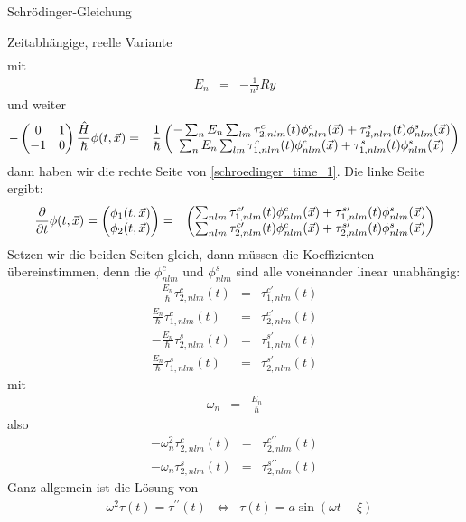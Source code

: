 \begin{chapter}{\titlestr}
\begin{section}{Schrödinger-Gleichung}
\begin{subsection}{Zeitabhängige, reelle Variante}
\begin{eqnarray*}
{}
\end{eqnarray*}
mit
\begin{eqnarray*}
E_n &=& -\frac{1}{n^2}Ry
\end{eqnarray*}
und weiter
\begin{eqnarray*}
-\begin{pmatrix} 0 & 1\\ -1 & 0\end{pmatrix}
\frac{\hat{H}}{\hbar}\phi(t, \vec{x})&=& \frac{1}{\hbar}
\begin{pmatrix}
-\sum_{n}E_n\sum_{lm} \tau^c_{2,nlm}(t)\phi^c_{nlm}(\vec{x})+\tau^s_{2,nlm}(t)\phi^s_{nlm}(\vec{x})\\
\sum_{n}E_n\sum_{lm} \tau^c_{1,nlm}(t)\phi^c_{nlm}(\vec{x})+\tau^s_{1,nlm}(t)\phi^s_{nlm}(\vec{x})
\end{pmatrix}
\end{eqnarray*}
dann haben wir die rechte Seite von \ref{schroedinger_time_1}. Die linke Seite ergibt:
\begin{eqnarray*}
\frac{\partial}{\partial t}\phi(t, \vec{x})=\begin{pmatrix}\phi_1(t, \vec{x})\\ \phi_2(t, \vec{x})\end{pmatrix} &=& 
\begin{pmatrix}
\sum_{nlm} \tau^{c\prime}_{1,nlm}(t)\phi^c_{nlm}(\vec{x})+\tau^{s\prime}_{1,nlm}(t)\phi^s_{nlm}(\vec{x})\\
\sum_{nlm} \tau^{c\prime}_{2,nlm}(t)\phi^c_{nlm}(\vec{x})+\tau^{s\prime}_{2,nlm}(t)\phi^s_{nlm}(\vec{x})
\end{pmatrix}
\end{eqnarray*}
Setzen wir die beiden Seiten gleich, dann müssen die Koeffizienten übereinstimmen, denn die $\phi^c_{nlm}$ und $\phi^s_{nlm}$ sind alle voneinander linear unabhängig:
\begin{eqnarray*}
-\frac{E_n}{\hbar}\tau^c_{2,nlm}(t)&=&\tau^{c\prime}_{1,nlm}(t)\\
\frac{E_n}{\hbar}\tau^c_{1,nlm}(t)&=&\tau^{c\prime}_{2,nlm}(t)\\
-\frac{E_n}{\hbar}\tau^s_{2,nlm}(t)&=&\tau^{s\prime}_{1,nlm}(t)\\
\frac{E_n}{\hbar}\tau^s_{1,nlm}(t)&=&\tau^{s\prime}_{2,nlm}(t)
\end{eqnarray*}
mit
\begin{eqnarray*}
\omega_n &=& \frac{E_n}{\hbar}
\end{eqnarray*}
also
\begin{eqnarray*}
-\omega_n^2\tau^c_{2,nlm}(t)&=&\tau^{c\prime\prime}_{2,nlm}(t)\\
-\omega_n\tau^s_{2,nlm}(t)&=&\tau^{s\prime\prime}_{2,nlm}(t)
\end{eqnarray*}
Ganz allgemein ist die Lösung von
\begin{eqnarray*}
-\omega^2\tau(t) = \tau^{\prime\prime}(t)&\Leftrightarrow& \tau(t) = a\sin(\omega t+\xi)
\end{eqnarray*}

\end{subsection}
\end{section}
\end{chapter}
